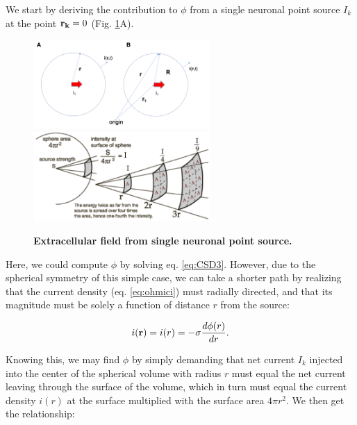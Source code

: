 \subsubsection{}
We start by deriving the contribution to $\phi$ from a single neuronal point source $I_k$ at the point ${\bf r_k}=0$ (Fig. \ref{VC:fig:pointsource}A). 

\begin{figure}[!ht]
\begin{center}
\includegraphics[width=0.6\textwidth]{Figures/VC/Pointsource.png}
\includegraphics[width=0.6\textwidth]{Figures/VC/pointsource_3D_illustration.png}
\end{center}
\caption{\textbf{Extracellular field from single neuronal point source.} 
}
\label{VC:fig:pointsource}
\end{figure}

Here, we could compute $\phi$ by solving eq. \ref{eq:CSD3}. However, due to the spherical symmetry of this simple case, we can take a shorter path by realizing that the current density (eq. \ref{eq:ohmici}) must radially directed, and that its magnitude must be solely a function of distance $r$ from the source:

\begin{equation}
i({\bf r}) = i(r) = -\sigma \frac{d\phi(r)}{dr}.
\end{equation}

Knowing this, we may find $\phi$ by simply demanding that net current $I_k$ injected into the center of the spherical volume with radius $r$ must equal the net current leaving through the surface of the volume, which in turn must equal the current density $i(r)$ at the surface multiplied with the surface area $4\pi r^2$. We then get the relationship:

